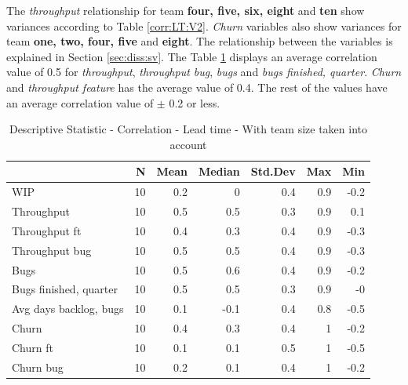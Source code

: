\documentclass[UKenglish]{ifimaster}  %
\begin{document}
The \textit{throughput} relationship for team \textbf{four, five, six, eight} and \textbf{ten} show variances according to Table \ref{corr:LT:V2}. \textit{Churn} variables also show variances for team \textbf{one, two, four, five} and \textbf{eight}. The relationship between the variables is  explained in Section \ref{sec:diss:sv}.
The Table \ref{DS:corr:LT:v2} displays an average correlation value of 0.5 for  \textit{throughput}, \textit{throughput bug}, \textit{bugs} and \textit{bugs finished, quarter}. \textit{Churn} and \textit{throughput feature} has the average value of 0.4. The rest of the values have an average correlation value of $\pm$ 0.2 or less.



\begin{table}[H]
 \centering
 \begin{tabular}{ | l | r | r | r | r | r | r | }
 \hline
& \bf{N} & \bf{Mean} & \bf{Median} & \bf{Std.Dev} & \bf{Max} & \bf{Min} \\ \hline
WIP  & 10 & 0.2 & 0 & 0.4 & 0.9 & -0.2\\ \hline
Throughput  & 10 & 0.5 & 0.5 & 0.3 & 0.9 & 0.1\\ \hline
Throughput ft  & 10 & 0.4 & 0.3 & 0.4 & 0.9 & -0.3\\ \hline
Throughput bug  & 10 & 0.5 & 0.5 & 0.4 & 0.9 & -0.3\\ \hline
Bugs  & 10 & 0.5 & 0.6 & 0.4 & 0.9 & -0.2\\ \hline
Bugs finished, quarter  & 10 & 0.5 & 0.5 & 0.3 & 0.9 & -0\\ \hline
Avg days backlog, bugs  & 10 & 0.1 & -0.1 & 0.4 & 0.8 & -0.5\\ \hline
Churn  & 10 & 0.4 & 0.3 & 0.4 & 1 & -0.2\\ \hline
Churn ft  & 10 & 0.1 & 0.1 & 0.5 & 1 & -0.5\\ \hline
Churn bug  & 10 & 0.2 & 0.1 & 0.4 & 1 & -0.2 \\ \hline
\end{tabular}
 \caption{Descriptive Statistic - Correlation - Lead time - With team size taken into account}
 \label{DS:corr:LT:v2}
 \end{table}
\end{document}
